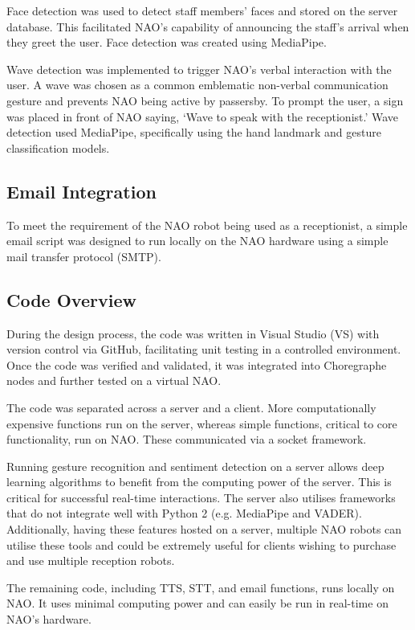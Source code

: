 \documentclass[conference]{IEEEtran}
\begin{document}
Face detection was used to detect staff members’ faces and stored on the server database. This facilitated NAO’s capability of announcing the staff’s arrival when they greet the user. Face detection was created using MediaPipe.

Wave detection was implemented to trigger NAO’s verbal interaction with the user. A wave was chosen as a common emblematic non-verbal communication gesture and prevents NAO being active by passersby.  To prompt the user, a sign was placed in front of NAO saying, ‘Wave to speak with the receptionist.’ Wave detection used MediaPipe, specifically using the hand landmark and gesture classification models. 

\subsection{Email Integration} To meet the requirement of the NAO robot being used as a receptionist, a simple email script was designed to run locally on the NAO hardware using a simple mail transfer protocol (SMTP).

\subsection{Code Overview} During the design process, the code was written in Visual Studio (VS) with version control via GitHub, facilitating unit testing in a controlled environment. Once the code was verified and validated, it was integrated into Choregraphe nodes and further tested on a virtual NAO. 

The code was separated across a server and a client. More computationally expensive functions run on the server, whereas simple functions, critical to core functionality, run on NAO. These communicated via a socket framework.

Running gesture recognition and sentiment detection on a server allows deep learning algorithms to benefit from the computing power of the server. This is critical for successful real-time interactions. The server also utilises frameworks that do not integrate well with Python 2 (e.g.  MediaPipe and VADER). Additionally, having these features hosted on a server, multiple NAO robots can utilise these tools and could be extremely useful for clients wishing to purchase and use multiple reception robots.

The remaining code, including TTS, STT, and email functions, runs locally on NAO. It uses minimal computing power and can easily be run in real-time on NAO’s hardware.
\end{document}

